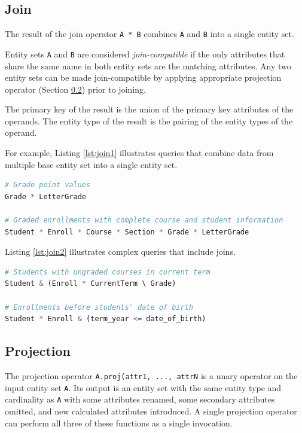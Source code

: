 \documentclass[letter,10pt]{article}
\begin{document}
\subsection{Join}\label{sec:join}
The result of the join operator \lstinline$A * B$ combines \lstinline$A$ and \lstinline$B$ into a single entity set.

Entity sets \lstinline$A$ and \lstinline$B$ are considered \emph{join-compatible} if the only attributes that share the same name in both entity sets are the matching attributes.
Any two entity sets can be made join-compatible by applying appropriate projection operator (Section \ref{sec:proj}) prior to joining.

The primary key of the result is the union of the primary key attributes of the operands. 
The entity type of the result is the pairing of the entity types of the operand.  

For example, Listing \ref{lst:join1} illustrates queries that combine data from multiple base entity set into a single entity set.
\begin{lstlisting}[language=Python, caption={Combining entities.}, label={lst:join1}]
# Grade point values
Grade * LetterGrade

# Graded enrollments with complete course and student information
Student * Enroll * Course * Section * Grade * LetterGrade
\end{lstlisting}

Listing \ref{lst:join2} illustrates complex queries that include joins.
\begin{lstlisting}[language=Python, caption={Join in expressions.}, label={lst:join2}]
# Students with ungraded courses in current term
Student & (Enroll * CurrentTerm \ Grade)

# Enrollments before students' date of birth
Student * Enroll & (term_year <= date_of_birth)
\end{lstlisting}

\subsection{Projection}\label{sec:proj}
The projection operator \lstinline$A.proj(attr1, ..., attrN$ is a unary operator on the input entity set \lstinline$A$.  
Its output is an entity set with the same entity type and cardinality as \lstinline$A$ with some attributes renamed, some secondary attributes omitted, and new calculated attributes introduced.
A single projection operator can perform all three of these functions as a single invocation. 
\end{document}
